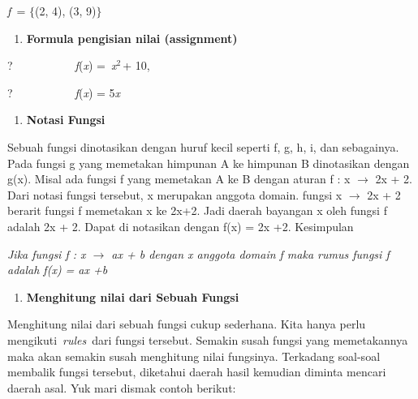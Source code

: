 \documentclass[11pt,fleqn]{book} %
\begin{document}
\noindent \textit{f~}= $\{$(2, 4), (3, 9)$\}$

\noindent 

\begin{enumerate}
\item  \textbf{Formula pengisian nilai (assignment)}
\end{enumerate}

\noindent \textbf{}

\noindent ?~~~~~~~~~~~\textit{f}(\textit{x}) =~\textit{x}${}^{2~}$+ 10,

\noindent 

\noindent ?~~~~~~~~~~~\textit{f}(\textit{x}) = 5\textit{x}

\noindent \textit{}

\begin{enumerate}
\item \textit{ }\textbf{ Notasi Fungsi}
\end{enumerate}

\noindent 

\noindent Sebuah fungsi dinotasikan dengan huruf kecil seperti f, g, h, i, dan sebagainya. Pada fungsi g yang memetakan himpunan A ke himpunan B dinotasikan dengan g(x). Misal ada fungsi f yang memetakan A ke B dengan aturan f : x $\mathrm{\to}$ 2x + 2. Dari notasi fungsi tersebut, x merupakan anggota domain. fungsi x $\mathrm{\to}$ 2x + 2 berarit fungsi f memetakan x ke 2x+2. Jadi daerah bayangan x oleh fungsi f adalah 2x + 2. Dapat di notasikan dengan f(x) = 2x +2. Kesimpulan

\noindent 

\noindent \textit{Jika fungsi f : x $\to$ ax + b dengan x anggota domain f maka rumus fungsi f adalah f(x) = ax +b}

\noindent \textit{}

\begin{enumerate}
\item \textit{ }\textbf{Menghitung nilai dari Sebuah Fungsi}
\end{enumerate}

\noindent 

\noindent Menghitung nilai dari sebuah fungsi cukup sederhana. Kita hanya perlu mengikuti~\textit{rules}~dari fungsi tersebut. Semakin susah fungsi yang memetakannya maka akan semakin susah menghitung nilai fungsinya. Terkadang soal-soal membalik fungsi tersebut, diketahui daerah hasil kemudian diminta mencari daerah asal. Yuk mari dismak contoh berikut:

\noindent 
\end{document}
